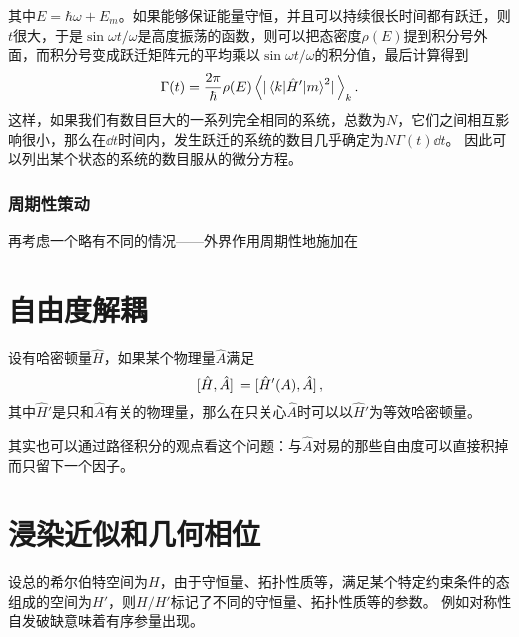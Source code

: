 \documentclass[UTF8, a4paper]{ctexart}
\begin{document}
其中$E = \hbar \omega + E_m$。如果能够保证能量守恒，并且可以持续很长时间都有跃迁，则$t$很大，于是$\sin \omega t / \omega$是高度振荡的函数，则可以把态密度$\rho(E)$提到积分号外面，而积分号变成跃迁矩阵元的平均乘以$\sin \omega t / \omega$的积分值，最后计算得到
\begin{equation}
    \Gamma(t) = \frac{2\pi}{\hbar} \rho(E) \expval{\abs*{\mel{k}{\hat{H}'}{m}^2}}_k.
\end{equation}
这样，如果我们有数目巨大的一系列完全相同的系统，总数为$N$，它们之间相互影响很小，那么在$\dd{t}$时间内，发生跃迁的系统的数目几乎确定为$N \Gamma(t) \dd{t}$。
因此可以列出某个状态的系统的数目服从的微分方程。

\subsubsection{周期性策动}

再考虑一个略有不同的情况——外界作用周期性地施加在

\section{自由度解耦}

设有哈密顿量$\hat{H}$，如果某个物理量$\hat{A}$满足
\[
    \comm*{\hat{H}}{\hat{A}} = \comm*{\hat{H}'(A)}{\hat{A}},
\]
其中$\hat{H}'$是只和$\hat{A}$有关的物理量，那么在只关心$\hat{A}$时可以以$\hat{H}'$为等效哈密顿量。

其实也可以通过路径积分的观点看这个问题：与$\hat{A}$对易的那些自由度可以直接积掉而只留下一个因子。


\section{浸染近似和几何相位}

设总的希尔伯特空间为$H$，由于守恒量、拓扑性质等，满足某个特定约束条件的态组成的空间为$H'$，则$H / H'$标记了不同的守恒量、拓扑性质等的参数。
例如对称性自发破缺意味着有序参量出现。
\end{document}
